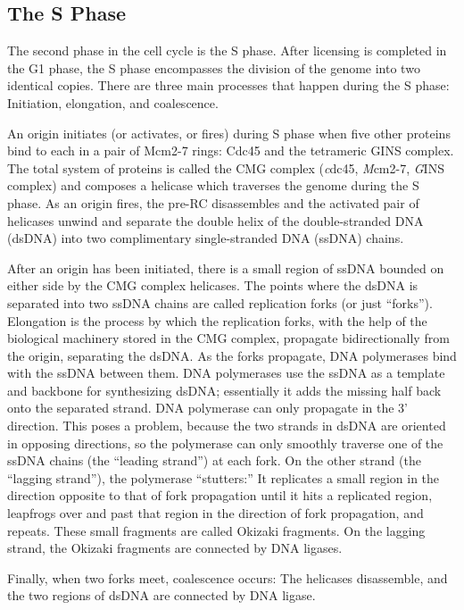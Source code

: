		\subsection{The S Phase}
		\label{subsec:SPhase}
		
		The second phase in the cell cycle is the S phase.
		After licensing is completed in the G1 phase, the S phase encompasses the division of the genome into two identical copies.
		There are three main processes that happen during the S phase:
		Initiation, elongation, and coalescence.
		
		An origin initiates (or activates, or fires) during S phase when five other proteins bind to each in a pair of Mcm2-7 rings:
		Cdc45 and the tetrameric GINS complex.
		The total system of proteins is called the CMG complex (\emph{c}dc45, \emph{M}cm2-7, \emph{G}INS complex) and composes a helicase which traverses the genome during the S phase.
		As an origin fires, the pre-RC disassembles and the activated pair of helicases unwind and separate the double helix of the double-stranded DNA (dsDNA) into two complimentary single-stranded DNA (ssDNA) chains. \cite{GINSComplex}
		
		After an origin has been initiated, there is a small region of ssDNA bounded on either side by the CMG complex helicases.
		The points where the dsDNA is separated into two ssDNA chains are called replication forks (or just ``forks'').
		Elongation is the process by which the replication forks, with the help of the biological machinery stored in the CMG complex, propagate bidirectionally from the origin, separating the dsDNA.
		As the forks propagate, DNA polymerases bind with the ssDNA between them.
		DNA polymerases use the ssDNA as a template and backbone for synthesizing dsDNA; essentially it adds the missing half back onto the separated strand.
		DNA polymerase can only propagate in the 3' direction.
		This poses a problem, because the two strands in dsDNA are oriented in opposing directions, so the polymerase can only smoothly traverse one of the ssDNA chains (the ``leading strand'') at each fork.
		On the other strand (the ``lagging strand''), the polymerase ``stutters:''
		It replicates a small region in the direction opposite to that of fork propagation until it hits a replicated region, leapfrogs over and past that region in the direction of fork propagation, and repeats.
		These small fragments are called Okizaki fragments.
		On the lagging strand, the Okizaki fragments are connected by DNA ligases.
		
		Finally, when two forks meet, coalescence occurs:
		The helicases disassemble, and the two regions of dsDNA are connected by DNA ligase. \cite{MolecularCellBiology}
		
